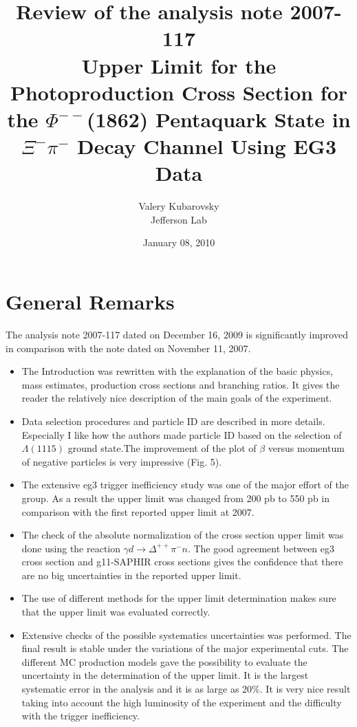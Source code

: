 \documentclass[12pt]{article}
\begin{document}
\title{Review of the analysis note 2007-117 \\Upper Limit for the Photoproduction Cross Section
for the $\Phi^
{--}$(1862) Pentaquark State in
$\Xi^-\pi^-$ Decay Channel Using EG3 Data}

\author{Valery Kubarovsky\\
Jefferson Lab}
\date{January 08, 2010}
\maketitle

\section*{General Remarks}

The analysis note 2007-117 dated on December 16, 2009 is significantly improved in comparison with the note
dated on November 11, 2007. 

\begin{itemize}
\item{}
The Introduction was rewritten with the explanation of the basic physics, mass estimates, production cross sections and branching ratios. It gives the reader the relatively nice description of the main goals of the experiment.
\item{}
Data selection procedures and particle ID are described in more details. Especially I like how the authors made particle ID based on the selection of $\Lambda(1115)$ ground state.The improvement of the plot of
$\beta$ versus momentum of negative particles is very impressive (Fig. 5). 
\item{}
The extensive eg3 trigger inefficiency study was one of the major effort of the group. As a result the upper limit
was changed from 200 pb to 550 pb in comparison with the first reported upper limit at 2007.
\item{}
The check of the absolute normalization of the cross section upper limit was done using the
reaction $\gamma d \to \Delta^{++} \pi^- n$. The good agreement between eg3 cross section and g11-SAPHIR
cross sections gives the confidence that there are no big uncertainties in the reported upper limit.
\item{}
The use of different methods for the upper limit determination makes sure that the upper limit was evaluated correctly.
\item{}
Extensive checks of the possible systematics uncertainties was performed. The final result is stable under the variations of the major experimental cuts. The different MC production models gave the possibility to evaluate the
uncertainty in the determination of the upper limit. It is the largest systematic error in the analysis and it is as large as 20\%.  It is very nice result taking into account the high luminosity of the experiment and the difficulty with the trigger inefficiency.
\end{itemize}
\end{document}
